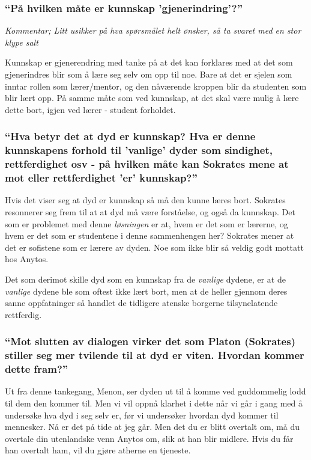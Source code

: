 \documentclass[a4paper]{IEEEtran}
\begin{document}
        \subsubsection{``På hvilken måte er kunnskap 'gjenerindring'?''}
        \textit{Kommentar; Litt usikker på hva spørsmålet helt ønsker, så ta svaret med 
        en stor klype salt}

        Kunnskap er gjenerendring med tanke på at det kan forklares med at 
        det som gjenerindres blir som å lære seg selv om opp til noe. 
        Bare at det er sjelen som inntar rollen som lærer/mentor, og den 
        nåværende kroppen blir da studenten som blir lært opp. På samme måte som ved 
        kunnskap, at det skal være mulig å lære dette bort, igjen ved lærer - student
        forholdet. \medskip

        \subsubsection{``Hva betyr det at dyd er kunnskap? 
        Hva er denne kunnskapens forhold til 'vanlige' dyder som 
        sindighet, rettferdighet osv - på hvilken måte kan Sokrates mene at mot
        eller rettferdighet 'er' kunnskap?''}
        Hvis det viser seg at dyd er kunnskap så må den kunne læres bort. Sokrates 
        resonnerer seg frem til at at dyd må være forståelse, og også da kunnskap. 
        Det som er problemet med denne \textit{løsningen} er at, hvem er det som er 
        lærerne, og hvem er det som er studentene i denne sammenhengen her? Sokrates 
        mener at det er sofistene som er lærere av dyden. Noe som ikke blir så 
        veldig godt mottatt hos Anytos. 

        Det som derimot skille dyd som en kunnskap fra de \textit{vanlige} dydene,
        er at de \textit{vanlige} dydene ble som oftest ikke lært bort, men
        at de heller gjennom deres sanne oppfatninger så handlet de tidligere
        atenske borgerne tilsynelatende rettferdig. \cite{wiki_Menon} \medskip

        \subsubsection{``Mot slutten av dialogen virker det som Platon (Sokrates) 
        stiller seg mer tvilende til at dyd er viten. Hvordan kommer dette fram?''}
        
        \begin{displayquote}
            Ut fra denne tankegang, Menon, ser dyden ut til å komme ved guddommelig 
            lodd til dem den kommer til. Men vi vil oppnå klarhet i dette når vi
            går i gang med å undersøke hva dyd i seg selv er, før vi undersøker
            hvordan dyd kommer til mennesker. Nå er det på tide at jeg går. 
            Men det du er blitt overtalt om, må du overtale din utenlandske venn
            Anytos om, slik at han blir midlere. Hvis du får han overtalt ham, 
            vil du gjøre atherne en tjeneste.
        \end{displayquote} \medskip
\end{document}
